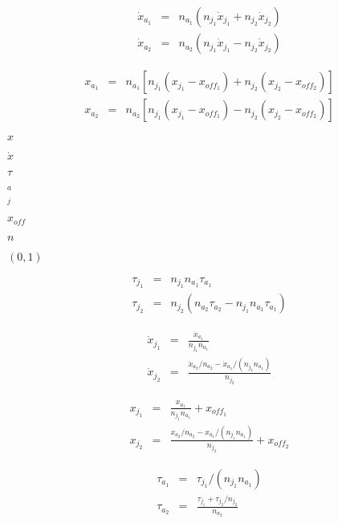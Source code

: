 \documentclass{article}
\begin{document}
\begin{eqnarray*} \dot{x}_{a_1} & = & n_{a_1} ( n_{j_1} \dot{x}_{j_1} + n_{j_2} \dot{x}_{j_2} ) \\[2.5em] \dot{x}_{a_2} & = & n_{a_2} ( n_{j_1} \dot{x}_{j_1} - n_{j_2} \dot{x}_{j_2} ) \end{eqnarray*}
\pagebreak

\begin{eqnarray*} x_{a_1} & = & n_{a_1} \left[ n_{j_1} (x_{j_1} - x_{off_1}) + n_{j_2} (x_{j_2} - x_{off_2}) \right] \\[2.5em] x_{a_2} & = & n_{a_2} \left[ n_{j_1} (x_{j_1} - x_{off_1}) - n_{j_2} (x_{j_2} - x_{off_2}) \right] \end{eqnarray*}
\pagebreak

$ x $
\pagebreak

$ \dot{x} $
\pagebreak

$ \tau $
\pagebreak

$ _a $
\pagebreak

$ _j $
\pagebreak

$ x_{off}$
\pagebreak

$ n $
\pagebreak

$ (0, 1) $
\pagebreak

\begin{eqnarray*} \tau_{j_1} & = & n_{j_1} n_{a_1} \tau_{a_1} \\ \tau_{j_2} & = & n_{j_2} (n_{a_2} \tau_{a_2} - n_{j_1} n_{a_1} \tau_{a_1}) \end{eqnarray*}
\pagebreak

\begin{eqnarray*} \dot{x}_{j_1} & = & \frac{ \dot{x}_{a_1} }{ n_{j_1} n_{a_1} } \\ \dot{x}_{j_2} & = & \frac{ \dot{x}_{a_2} / n_{a_2} - \dot{x}_{a_1} / (n_{j_1} n_{a_1}) }{ n_{j_2} } \end{eqnarray*}
\pagebreak

\begin{eqnarray*} x_{j_1} & = & \frac{ x_{a_1} }{ n_{j_1} n_{a_1} } + x_{off_1} \\ x_{j_2} & = & \frac{ x_{a_2} / n_{a_2} - x_{a_1} / (n_{j_1} n_{a_1}) }{ n_{j_2} } + x_{off_2} \end{eqnarray*}
\pagebreak

\begin{eqnarray*} \tau_{a_1} & = & \tau_{j_1} / (n_{j_1} n_{a_1}) \\ \tau_{a_2} & = & \frac{ \tau_{j_1} + \tau_{j_2} / n_{j_2} }{ n_{a_2} } \end{eqnarray*}
\pagebreak
\end{document}
